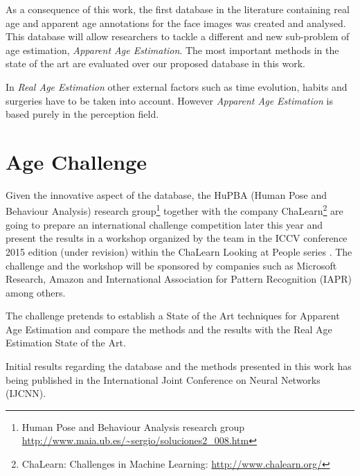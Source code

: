 As a consequence of this work, the first database in the literature containing real age and apparent age annotations for the face images was created and analysed. This database will allow researchers to tackle a different and new sub-problem of age estimation, \textit{Apparent Age Estimation}. The most important methods in the state of the art are evaluated over our proposed database in this work.

In \textit{Real Age Estimation} other external factors such as time evolution, habits and surgeries have to be taken into account. However \textit{Apparent Age Estimation} is based purely in the perception field.


\section{Age Challenge}

Given the innovative aspect of the database, the HuPBA (Human Pose and Behaviour Analysis) research group\footnote{Human Pose and Behaviour Analysis research group\\ \url{http://www.maia.ub.es/~sergio/soluciones2_008.htm}} together with the company ChaLearn\footnote{ChaLearn: Challenges in Machine Learning: \url{http://www.chalearn.org/}} are going to prepare an international challenge competition later this year and present the results in a workshop organized by the team in the ICCV conference 2015 edition (under revision) within the ChaLearn Looking at People series \cite{LaP} \cite{SergioEscalera2014} \cite{Escalera:2013:MGR:2522848.2532595} \cite{conf/icmi/EscaleraGBRGAESASBS13}. The challenge and the workshop will be sponsored by companies such as Microsoft Research, Amazon and International Association for Pattern Recognition (IAPR) among others.

The challenge pretends to establish a State of the Art techniques for Apparent Age Estimation and compare the methods and the results with the Real Age Estimation State of the Art.

Initial results regarding the database and the methods presented in this work has being published in the International Joint Conference on Neural Networks (IJCNN).


